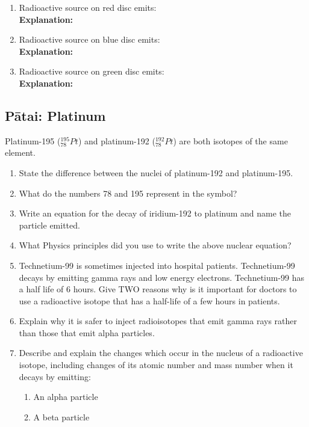 \documentclass[12pt]{report}
\begin{document}
{\begin{enumerate}
	\item Radioactive source on red disc emits: \\
	\textbf{Explanation:}\vspace{1.5cm}
	\item Radioactive source on blue disc emits: \\
	\textbf{Explanation:}\vspace{1.5cm}
	\item Radioactive source on green disc emits: \\
	\textbf{Explanation:}\vspace{1.5cm}
\end{enumerate}

\newpage
\subsection{Pātai: Platinum}
Platinum-195 (${}^{195}_{78}Pt$) and platinum-192 (${}^{192}_{78}Pt$) are both isotopes of the same element.

\begin{enumerate}
	\item State the difference between the nuclei of platinum-192 and platinum-195.\vspace{1.5cm}
	\item What do the numbers 78 and 195 represent in the symbol?\vspace{1.5cm}
	\item Write an equation for the decay of iridium-192 to platinum and name the particle emitted.\vspace{1.5cm}
	\item What Physics principles did you use to write the above nuclear equation?\vspace{1.5cm}
	\item Technetium-99 is sometimes injected into hospital patients. Technetium-99 decays by emitting gamma rays and low energy electrons. Technetium-99 has a half life of 6 hours. Give TWO reasons why is it important for doctors to use a radioactive isotope that has a half-life of a few hours in patients.\vspace{1.5cm}
	\item Explain why it is safer to inject radioisotopes that emit gamma rays rather than those that emit alpha particles.\vspace{1.5cm}
	\item Describe and explain the changes which occur in the nucleus of a radioactive isotope, including changes of its atomic number and mass number when it decays by emitting:
	\begin{enumerate}
		\item An alpha particle\vspace{1.5cm}
		\item A beta particle\vspace{1.5cm}
	\end{enumerate}
\end{enumerate}

}
\end{document}
